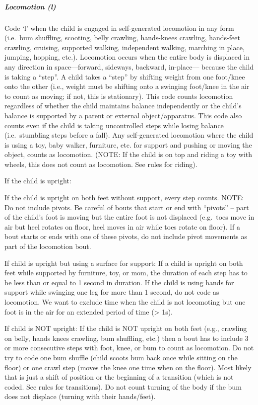 \documentclass[
  12pt,
]{book}
\begin{document}
\hypertarget{child_locomotion}{%
\subparagraph{Locomotion (l)}\label{child_locomotion}}

Code `l' when the child is engaged in self-generated locomotion in any form (i.e.~bum shuffling, scooting, belly crawling, hands-knees crawling, hands-feet crawling, cruising, supported walking, independent walking, marching in place, jumping, hopping, etc.). Locomotion occurs when the entire body is displaced in any direction in space---forward, sideways, backward, in-place--- because the child is taking a ``step''. A child takes a ``step'' by shifting weight from one foot/knee onto the other (i.e., weight must be shifting onto a swinging foot/knee in the air to count as moving; if not, this is stationary).
This code counts locomotion regardless of whether the child maintains balance independently or the child's balance is supported by a parent or external object/apparatus. This code also counts even if the child is taking uncontrolled steps while losing balance (i.e.~stumbling steps before a fall). Any self-generated locomotion where the child is using a toy, baby walker, furniture, etc. for support and pushing or moving the object, counts as locomotion. (NOTE: If the child is on top and riding a toy with wheels, this does not count as locomotion. See rules for riding).

If the child is upright:

If the child is upright on both feet without support, every step counts.
NOTE: Do not include pivots. Be careful of bouts that start or end with ``pivots'' -- part of the child's foot is moving but the entire foot is not displaced (e.g.~toes move in air but heel rotates on floor, heel moves in air while toes rotate on floor). If a bout starts or ends with one of these pivots, do not include pivot movements as part of the locomotion bout.

If child is upright but using a surface for support:
If a child is upright on both feet while supported by furniture, toy, or mom, the duration of each step has to be less than or equal to 1 second in duration. If the child is using hands for support while swinging one leg for more than 1 second, do not code as locomotion. We want to exclude time when the child is not locomoting but one foot is in the air for an extended period of time (\textgreater{} 1s).

If child is NOT upright:
If the child is NOT upright on both feet (e.g., crawling on belly, hands knees crawling, bum shuffling, etc.) then a bout has to include 3 or more consecutive steps with foot, knee, or bum to count as locomotion. Do not try to code one bum shuffle (child scoots bum back once while sitting on the floor) or one crawl step (moves the knee one time when on the floor). Most likely that is just a shift of position or the beginning of a transition (which is not coded. See rules for transitions). Do not count turning of the body if the bum does not displace (turning with their hands/feet).
\end{document}
